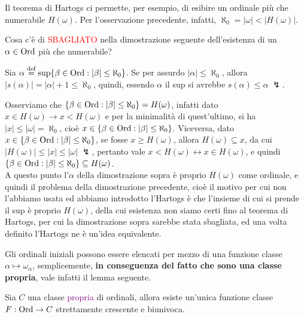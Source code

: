 Il teorema di Hartogs ci permette, per esempio, di esibire un ordinale pi\`u che numerabile $H(\omega)$. Per l'osservazione precedente, infatti, $\aleph_0 = |\omega| < |H(\omega)|$.

\begin{exercise}
	Cosa c'\`e di \textcolor{red}{SBAGLIATO} nella dimostrazione seguente dell'esistenza di un $\alpha \in \operatorname{Ord}$ pi\`u che numerabile?
\end{exercise}

Sia $\alpha \overset{\text{def}}{=} \sup\{\beta \in \operatorname{Ord} : |\beta| \leq \aleph_0\}$. Se per assurdo $|\alpha| \leq \aleph_0$, allora $|s(\alpha)| = |\alpha| + 1 \leq \aleph_0$, quindi, essendo $\alpha$ il sup si avrebbe $s(\alpha) \leq \alpha \;\lightning$.

\begin{soln}
	Osserviamo che $\{\beta \in \operatorname{Ord} : |\beta| \leq \aleph_0\} = H(\omega)$, infatti dato $x \in H(\omega) \to x < H(\omega)$ e per la minimalit\`a di quest'ultimo, si ha $|x| \leq |\omega| = \aleph_0$, cio\`e $x \in \{\beta \in \operatorname{Ord} : |\beta| \leq \aleph_0\}$. Viceversa, dato $x \in \{\beta \in \operatorname{Ord} : |\beta| \leq \aleph_0\}$,
	se fosse $x \geq H(\omega)$, allora $H(\omega) \subseteq x$, da cui $|H(\omega)| \leq |x| \leq |\omega| \; \lightning$, pertanto vale $x < H(\omega) \leftrightarrow x \in H(\omega)$, e quindi $\{\beta \in \operatorname{Ord} : |\beta| \leq \aleph_0\} \subseteq H(\omega)$.\\
	A questo punto l'$\alpha$ della dimostrazione sopra \`e proprio $H(\omega)$ come ordinale, e quindi il problema della dimostrazione precedente, cio\`e il motivo per cui non l'abbiamo usata ed abbiamo introdotto l'Hartogs \`e che l'insieme di cui si prende il sup \`e proprio $H(\omega)$, della cui esistenza non siamo certi fino al teorema di Hartogs,
	per cui la dimostrazione sopra sarebbe stata sbagliata, ed una volta definito l'Hartogs ne \`e un'idea equivalente.
\end{soln}

Gli ordinali iniziali possono essere elencati per mezzo di una funzione classe $\alpha \mapsto \omega_\alpha$, semplicemente, \textbf{in conseguenza del fatto che sono una classe propria}, vale infatti il lemma seguente.

\begin{lemma}[$F : \Ord \to C$]
	Sia $C$ una classe \textcolor{purple}{propria} di ordinali, allora esiste un'unica funzione classe $F : \operatorname{Ord} \rightarrow C$ strettamente crescente e biunivoca.
\end{lemma}

